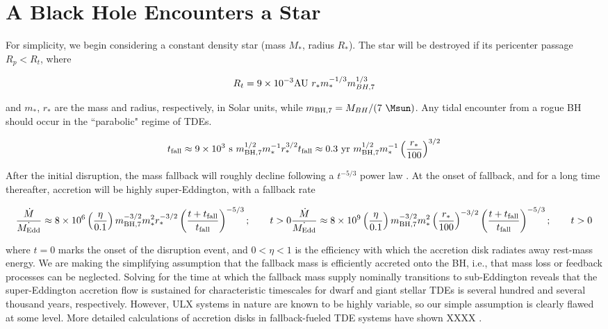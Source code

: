 \section{A Black Hole Encounters a Star}\label{section:general}


For simplicity, we begin considering a constant density star (mass $M_*$, radius $R_*$).  The star will be destroyed if its pericenter passage $R_p < R_t$, where

\begin{equation}
R_t = 9 \times 10^{-3} {\rm AU}~ r_{*} m_{*}^{-1/3} m_{BH,7}^{1/3}
\end{equation}

and $m_*$, $r_*$ are the mass and radius, respectively, in Solar units, while $m_{{\rm BH},7} = M_{BH}/(7~\Msun)$.  Any tidal encounter from a rogue BH should occur in the ``parabolic" regime of TDEs.   

\begin{equation}
t_{\rm fall} \approx 9 \times 10^3~{\rm s}~m_{{\rm BH},7}^{1/2}m_{*}^{-1}r_{*}^{3/2}\\
t_{\rm fall} \approx 0.3~{\rm yr}~m_{{\rm BH},7}^{1/2}m_{*}^{-1}\left(\frac{r_{*}}{100}\right)^{3/2}
\end{equation}

After the initial disruption, the mass fallback will roughly decline following a $t^{-5/3}$ power law \citep{Rees_TDE}. At the onset of fallback, and for a long time thereafter, accretion will be highly super-Eddington, with a fallback rate

\begin{equation}
\frac{\dot{M}}{\dot{M_{\rm Edd}}} \approx 8 \times 10^{6} \left(\frac{\eta}{0.1}\right)m_{\rm BH,7}^{-3/2}m_{*}^{2}r_*^{-3/2} \left(\frac{t+t_{\rm fall}}{t_{\rm fall}}\right)^{-5/3}; \qquad t > 0
\frac{\dot{M}}{\dot{M_{\rm Edd}}} \approx 8 \times 10^{9} \left(\frac{\eta}{0.1}\right)m_{\rm BH,7}^{-3/2}m_{*}^{2}\left(\frac{r_*}{100}\right)^{-3/2} \left(\frac{t+t_{\rm fall}}{t_{\rm fall}}\right)^{-5/3}; \qquad t > 0
\end{equation}

where $t=0$ marks the onset of the disruption event, and $0 < \eta < 1$ is the efficiency with which the accretion disk radiates away rest-mass energy.  We are making the simplifying assumption that the fallback mass is efficiently accreted onto the BH, i.e., that mass loss or feedback processes can be neglected.  Solving for the time at which the fallback mass supply nominally transitions to sub-Eddington reveals that the super-Eddington accretion flow is sustained for characteristic timescales for dwarf and giant stellar TDEs is several hundred and several thousand years, respectively.  
However, ULX systems in nature are known to be highly variable, so our simple assumption is clearly flawed at some level.   More detailed calculations of accretion disks in fallback-fueled TDE systems have shown XXXX \citep{XX}.  


